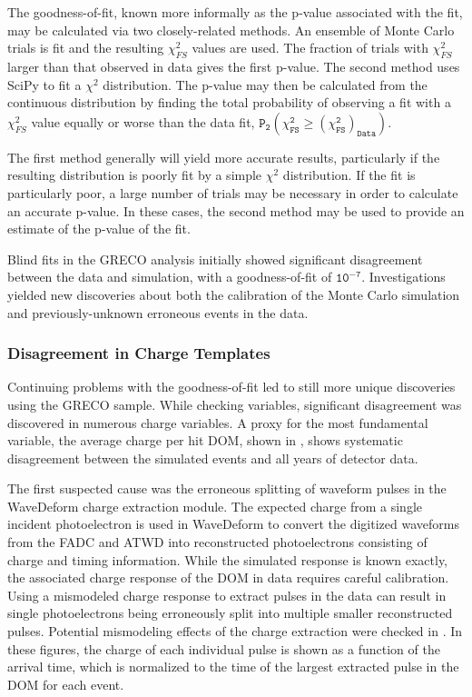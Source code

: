 The goodness-of-fit, known more informally as the p-value associated with the fit, may be calculated via two closely-related methods.
An ensemble of Monte Carlo trials is fit and the resulting $\chi_{FS}^2$ values are used.
The fraction of trials with $\chi_{FS}^2$ larger than that observed in data gives the first p-value.
The second method uses SciPy  to fit a $\chi^2$ distribution. 
The p-value may then be calculated from the continuous distribution by finding the total probability of observing a fit with a $\chi_{FS}^2$ value equally or worse than the data fit, $\mathtt{P_2\left(\chi_{FS}^2 \geq \left(\chi_{FS}^2\right)_{Data}\right)}$.

The first method generally will yield more accurate results, particularly if the resulting distribution is poorly fit by a simple $\chi^2$ distribution. 
If the fit is particularly poor, a large number of trials may be necessary in order to calculate an accurate p-value.
In these cases, the second method may be used to provide an estimate of the p-value of the fit.

Blind fits in the GRECO analysis initially showed significant disagreement between the data and simulation, with a goodness-of-fit of $\mathtt{10^{-7}}$.
Investigations yielded new discoveries about both the calibration of the Monte Carlo simulation and previously-unknown erroneous events in the data.

\label{subsubsec:charge_templates}
\subsubsection{Disagreement in Charge Templates}
Continuing problems with the goodness-of-fit led to still more unique discoveries using the GRECO sample.
While checking variables, significant disagreement was discovered in numerous charge variables.
A proxy for the most fundamental variable, the average charge per hit DOM, shown in , shows systematic disagreement between the simulated events and all years of detector data.

The first suspected cause was the erroneous splitting of waveform pulses in the WaveDeform charge extraction module.
The expected charge from a single incident photoelectron is used in WaveDeform to convert the digitized waveforms from the FADC and ATWD into reconstructed photoelectrons consisting of charge and timing information.
While the simulated response is known exactly, the associated charge response of the DOM in data requires careful calibration.
Using a mismodeled charge response to extract pulses in the data can result in single photoelectrons being erroneously split into multiple smaller reconstructed pulses.
Potential mismodeling effects of the charge extraction were checked in . 
In these figures, the charge of each individual pulse is shown as a function of the arrival time, which is normalized to the time of the largest extracted pulse in the DOM for each event.

